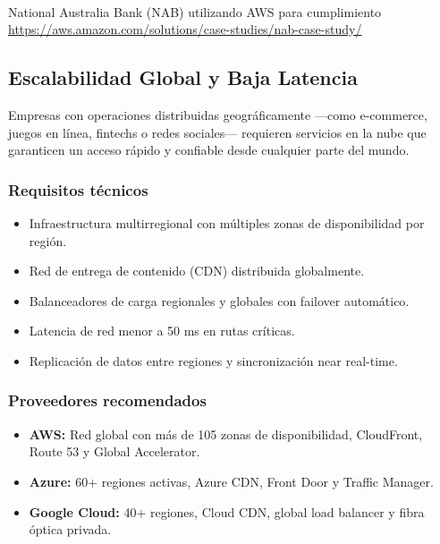 {                \paragraph{}National Australia Bank (NAB) utilizando AWS para cumplimiento \href{https://aws.amazon.com/solutions/case-studies/nab-case-study/}{https://aws.amazon.com/solutions/case-studies/nab-case-study/}

        \subsection{Escalabilidad Global y Baja Latencia}
            Empresas con operaciones distribuidas geográficamente —como e-commerce, juegos en línea, fintechs o redes sociales— requieren servicios en la nube que garanticen un acceso rápido y confiable desde cualquier parte del mundo.
                
            \subsubsection{Requisitos técnicos}
                \begin{itemize}
                    \item Infraestructura multirregional con múltiples zonas de disponibilidad por región.
                    \item Red de entrega de contenido (CDN) distribuida globalmente.
                    \item Balanceadores de carga regionales y globales con failover automático.
                    \item Latencia de red menor a 50 ms en rutas críticas.
                    \item Replicación de datos entre regiones y sincronización near real-time.
                \end{itemize}
                
            \subsubsection{Proveedores recomendados}
                \begin{itemize}
                    \item \textbf{AWS:} Red global con más de 105 zonas de disponibilidad, CloudFront, Route 53 y Global Accelerator.
                    \item \textbf{Azure:} 60+ regiones activas, Azure CDN, Front Door y Traffic Manager.
                    \item \textbf{Google Cloud:} 40+ regiones, Cloud CDN, global load balancer y fibra óptica privada.
                \end{itemize}
                
}
